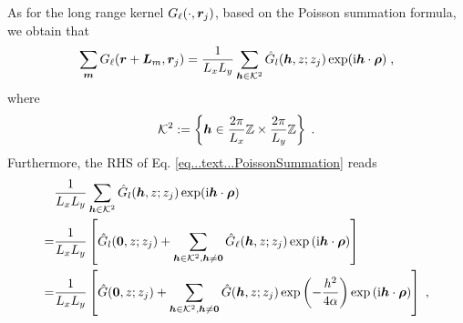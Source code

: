  As for the long  range kernel $ G_\ell(\cdot, \boldsymbol{r}_j)$, based on the Poisson summation formula, we obtain that 
\begin{equation}\label{eq...text...PoissonSummation}
 \sum_{\bm{m}}  G_\ell(\boldsymbol{r}+\bm{L}_m, \boldsymbol{r}_j)  =\frac{1}{ L_xL_y}   \sum_{\boldsymbol{h}\in\mathcal{K}^2} \Hat{G}_l(\boldsymbol{h},z;z_j)\exp(\textrm{i}\boldsymbol{h}\cdot \bm{\rho}) \;,
\end{equation}
where \[\mathcal{K}^2 := \left\{\boldsymbol{h} \in \frac{  2\pi}{L_x}\mathbb{Z}\times \frac{  2\pi}{L_y}\mathbb{Z} \right\}\;.\]
Furthermore, the RHS of Eq. \eqref{eq...text...PoissonSummation} reads
\begin{align*}
&\frac{1}{ L_xL_y}   \sum_{\boldsymbol{h}\in\mathcal{K}^2} \Hat{G}_l(\boldsymbol{h},z;z_j)\exp(\textrm{i}\boldsymbol{h}\cdot \bm{\rho})\\
=& \frac{1}{ L_xL_y}   \left[\hat{G}_l(\bm{0}, z; z_j)+\sum_{\boldsymbol{h}\in\mathcal{K}^2,\boldsymbol{h}\neq\bm{0}}  \hat{G}_\ell(\boldsymbol{h}, z; z_j)\exp{(\mathrm{i} \boldsymbol{h} \cdot \boldsymbol{\rho})}\right]\\
=&\frac{1}{ L_xL_y}   \left[\hat{G}(\bm{0}, z; z_j)+\sum_{\boldsymbol{h}\in\mathcal{K}^2,\boldsymbol{h}\neq\bm{0}}  \hat{G}(\boldsymbol{h}, z; z_j)\exp\left(-\frac{h^2}{4\alpha}\right)\exp{(\mathrm{i} \boldsymbol{h} \cdot \boldsymbol{\rho})}\right]\;,
\end{align*}
